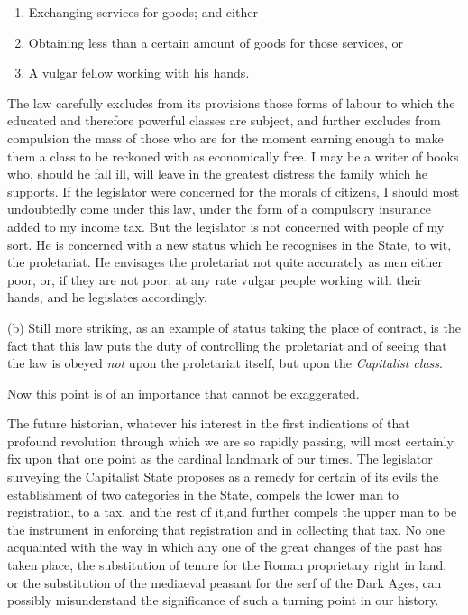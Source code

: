 \documentclass{book}
\begin{document}
\begin{enumerate}
	\item Exchanging services for goods; and either


	\item Obtaining less than a certain amount of goods for those services, or


	\item A vulgar fellow working with his hands.



\end{enumerate}
The law carefully excludes from its provisions those forms of labour to which the educated and therefore powerful classes are subject, and further excludes from compulsion the mass of those who are for the moment earning enough to make them a class to be reckoned with as economically free. I may be a writer of books who, should he fall ill, will leave in the greatest distress the family which he supports. If the legislator were concerned for the morals of citizens, I should most undoubtedly come under this law, under the form of a compulsory insurance added to my income tax. But the legislator is not concerned with people of my sort. He is concerned with a new status which he recognises in the State, to wit, the proletariat. He envisages the proletariat not quite accurately as men either poor, or, if they are not poor, at any rate vulgar people working with their hands, and he legislates accordingly.

(b) Still more striking, as an example of status taking the place of contract, is the fact that this law puts the duty of controlling the proletariat and of seeing that the law is obeyed \emph{not} upon the proletariat itself, but upon the \emph{Capitalist class}.

Now this point is of an importance that cannot be exaggerated.

The future historian, whatever his interest in the first indications of that profound revolution through which we are so rapidly passing, will most certainly fix upon that one point as the cardinal landmark of our times. The legislator surveying the Capitalist State proposes as a remedy for certain of its evils the establishment of two categories in the State, compels the lower man to registration, to a tax, and the rest of it,and further compels the upper man to be the instrument in enforcing that registration and in collecting that tax. No one acquainted with the way in which any one of the great changes of the past has taken place, the substitution of tenure for the Roman proprietary right in land, or the substitution of the mediaeval peasant for the serf of the Dark Ages, can possibly misunderstand the significance of such a turning point in our history.
\end{document}
